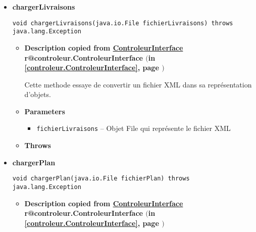 \documentclass[11pt,a4paper]{report}
\makeatletter
\newcommand{\refdefined}[1]{
\expandafter\ifx\csname r@#1\endcsname\relax
\relax\else
{$($in \ref{#1}, page \pageref{#1}$)$}\fi}
\makeatother
\begin{document}
{{{{{\begin{itemize}
{\begin{itemize}
{Ajoute un observateur à la tournée
}
\item{
{\bf  Parameters}
  \begin{itemize}
   \item{
\texttt{tourneeObserveur} -- }
  \end{itemize}
}%
\end{itemize}
}%
\item{ 
\hypertarget{controleur.Controleur.chargerLivraisons(java.io.File)}{{\bf  chargerLivraisons}\\}
\begin{lstlisting}[frame=none]
void chargerLivraisons(java.io.File fichierLivraisons) throws java.lang.Exception\end{lstlisting} %
\begin{itemize}
\item{
{\bf  Description copied from \hyperlink{controleur.ControleurInterface}{ControleurInterface}{\small \refdefined{controleur.ControleurInterface}} }

Cette methode essaye de convertir un fichier XML dans sa représentation d'objets.
}
\item{
{\bf  Parameters}
  \begin{itemize}
   \item{
\texttt{fichierLivraisons} -- Objet File qui représente le fichier XML}
  \end{itemize}
}%
\item{{\bf  Throws}
}%
\end{itemize}
}%
\item{ 
\hypertarget{controleur.Controleur.chargerPlan(java.io.File)}{{\bf  chargerPlan}\\}
\begin{lstlisting}[frame=none]
void chargerPlan(java.io.File fichierPlan) throws java.lang.Exception\end{lstlisting} %
\begin{itemize}
\item{
{\bf  Description copied from \hyperlink{controleur.ControleurInterface}{ControleurInterface}{\small \refdefined{controleur.ControleurInterface}} }

}
\end{itemize}}
\end{itemize}}}}}}
\end{document}
